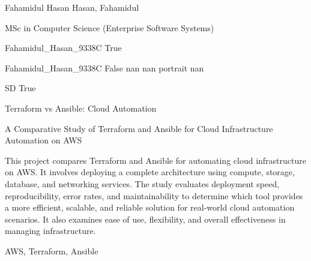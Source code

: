 
\begingroup{}\relax



\def\Key{Fahamidul_Hasan_9338C}

{Fahamidul Hasan}
{Hasan, Fahamidul}

{MSc in Computer Science (Enterprise Software Systems)}

{Fahamidul_Hasan_9338C}
{True}

{Fahamidul_Hasan_9338C}
{False}
{nan}
{nan}
{portrait}
{nan}

{SD}
{True}

{Terraform vs Ansible: Cloud Automation}

{A Comparative Study of Terraform and Ansible for Cloud Infrastructure Automation on AWS}

{This project compares Terraform and Ansible for automating cloud infrastructure on AWS. It involves deploying a complete architecture using compute, storage, database, and networking services. The study evaluates deployment speed, reproducibility, error rates, and maintainability to determine which tool provides a more efficient, scalable, and reliable solution for real-world cloud automation scenarios. It also examines ease of use, flexibility, and overall effectiveness in managing infrastructure.}

{AWS, Terraform, Ansible}

